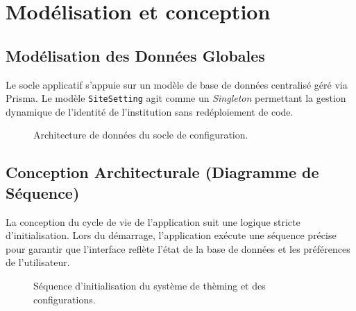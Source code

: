 \documentclass[12pt,a4paper]{report}
\begin{document}
\section{Modélisation et conception}

\subsection{Modélisation des Données Globales}
Le socle applicatif s'appuie sur un modèle de base de données centralisé géré via Prisma. Le modèle \texttt{SiteSetting} agit comme un \textit{Singleton} permettant la gestion dynamique de l'identité de l'institution sans redéploiement de code.

\begin{figure}[H]
    \centering
    \caption{Architecture de données du socle de configuration.}
\end{figure}

\subsection{Conception Architecturale (Diagramme de Séquence)}
La conception du cycle de vie de l'application suit une logique stricte d'initialisation. Lors du démarrage, l'application exécute une séquence précise pour garantir que l'interface reflète l'état de la base de données et les préférences de l'utilisateur.

\begin{figure}[H]
    \centering
    \caption{Séquence d'initialisation du système de thèming et des configurations.}
\end{figure}
\end{document}
